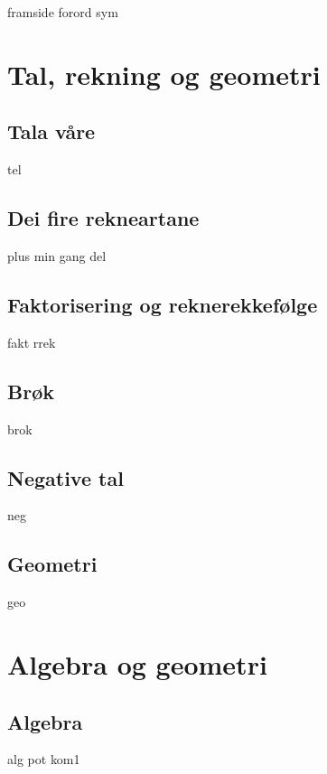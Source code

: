




{framside}
{forord}
{sym}
\newpage

{\footnotesize \tableofcontents}
\newpage
\part{Tal, rekning og geometri}

\chapter{Tala våre \label{Talavare}}
\newpage
{tel}
%
\chapter{Dei fire rekneartane \label{Rekneartane}}
\newpage
{plus}
{min}
{gang}
{del}
\chapter{Faktorisering og reknerekkefølge}
\newpage
{fakt}
{rrek}

\chapter{Brøk}
\newpage
{brok}

\chapter{Negative tal \label{Negtal}}
\newpage
{neg}


\chapter{Geometri}
\newpage
{geo}

\part{Algebra og geometri \label{Del2}}
\chapter{Algebra}
\newpage
{alg}
{pot}
\newpage
{kom1}

